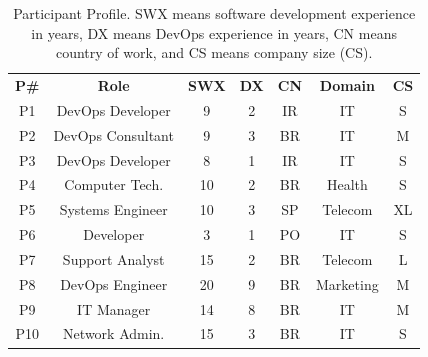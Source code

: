 \begin{table}[t]
\centering
\caption{Participant Profile. SWX means software development experience in years, DX means DevOps experience in years, CN means country of work, and CS means company size (CS).}
\label{participant_table}
\begin{tabular}{ccccccc}
\textbf{P\#}          & \textbf{Role}         & \textbf{SWX} & \textbf{DX} & \textbf{CN}   & \textbf{Domain}    & \multicolumn{1}{l}{\textbf{CS}} \\
P1                   & DevOps Developer      & 9            & 2           & IR            & IT                 & S                               \\

P2                   & DevOps Consultant       & 9            & 3           & BR            & IT                 & M                               \\

P3                   & DevOps Developer      & 8            & 1           & IR            & IT                 & S                               \\

P4                   & Computer Tech.        & 10           & 2           & BR            & Health             & S                               \\

P5                   & Systems Engineer      & 10           & 3           & SP            & Telecom            & XL                              \\

P6                   & Developer             & 3            & 1           & PO            & IT                 & S                               \\

P7                   & Support Analyst       & 15           & 2           & BR            & Telecom            & L                               \\

P8                   & DevOps Engineer       & 20           & 9           & BR            & Marketing              & M                               \\

P9                   & IT Manager            & 14           & 8           & BR            & IT                 & M                               \\

P10                  & Network Admin.        & 15           & 3           & BR            & IT                 & S                               \\


\end{tabular}
\end{table}
